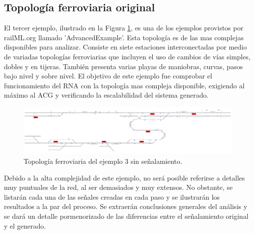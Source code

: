 \subsection{Topología ferroviaria original}

	El tercer ejemplo, ilustrado en la Figura \ref{fig:EJ3_1}, es una de los ejemplos provistos por railML.org llamado 'AdvancedExample'. Esta topología es de las mas complejas disponibles para analizar. Consiste en siete estaciones interconectadas por medio de variadas topologías ferroviarias que incluyen el uso de cambios de vías simples, dobles y en tijeras. También presenta varias playas de maniobras, curvas, pasos bajo nivel y sobre nivel. El objetivo de este ejemplo fue comprobar el funcionamiento del RNA con la topología mas compleja disponible, exigiendo al máximo al ACG y verificando la escalabilidad del sistema generado.
	
	\begin{figure}[h]
		\centering
		\includegraphics[width=1\textwidth]{resultados-obtenidos/ejemplo3/images/3_empty.png}
		\centering\caption{Topología ferroviaria del ejemplo 3 sin señalamiento.}
		\label{fig:EJ3_1}
	\end{figure}
	
	Debido a la alta complejidad de este ejemplo, no será posible referirse a detalles muy puntuales de la red, al ser demasiados y muy extensos. No obstante, se listarán cada una de las señales creadas en cada paso y se ilustrarán los resultados a la par del proceso. Se extraerán conclusiones generales del análisis y se dará un detalle pormenorizado de las diferencias entre el señalamiento original y el generado.
